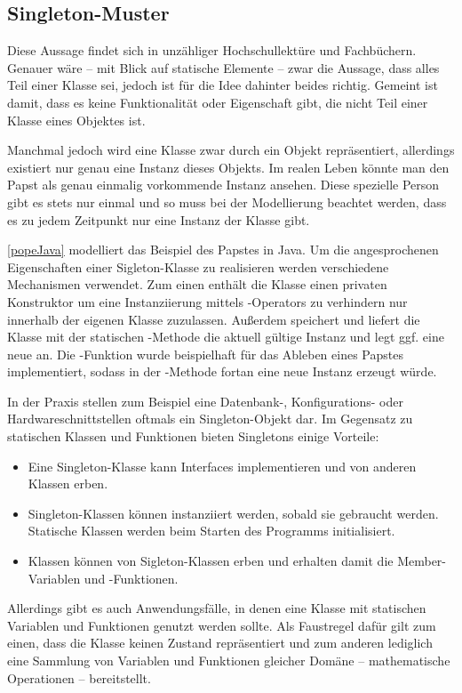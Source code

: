\subsection{Singleton-Muster}
 \cite{susanne_hackmack_objekte_2018} Diese Aussage findet sich in unzähliger Hochschullektüre und Fachbüchern. Genauer wäre -- mit Blick auf statische Elemente -- zwar die Aussage, dass alles Teil einer Klasse sei, jedoch ist für die Idee dahinter beides richtig. Gemeint ist damit, dass es keine Funktionalität oder Eigenschaft gibt, die nicht Teil einer Klasse \bzw eines Objektes ist.

Manchmal jedoch wird eine Klasse zwar durch ein Objekt repräsentiert, allerdings existiert nur genau eine Instanz dieses Objekts. Im realen Leben könnte man \zB den Papst als genau einmalig vorkommende Instanz ansehen. Diese spezielle Person gibt es stets nur einmal und so muss bei der Modellierung beachtet werden, dass es zu jedem Zeitpunkt nur eine Instanz der Klasse gibt.


\autoref{popeJava} modelliert das Beispiel des Papstes in Java. Um die angesprochenen Eigenschaften einer Sigleton-Klasse zu realisieren werden verschiedene Mechanismen verwendet. Zum einen enthält die Klasse einen privaten Konstruktor um eine Instanziierung mittels -Operators zu verhindern \bzw nur innerhalb der eigenen Klasse zuzulassen. Außerdem speichert und liefert die Klasse mit der statischen -Methode die aktuell gültige Instanz und legt ggf. eine neue an. Die -Funktion wurde beispielhaft für das Ableben eines Papstes implementiert, sodass in der -Methode fortan eine neue Instanz erzeugt würde.

In der Praxis stellen zum Beispiel eine Datenbank-, Konfigurations- oder Hardwareschnittstellen oftmals ein Singleton-Objekt dar. Im Gegensatz zu statischen Klassen und Funktionen bieten Singletons einige Vorteile:

\begin{itemize}
    \item Eine Singleton-Klasse kann Interfaces implementieren und von anderen Klassen erben.
    \item Singleton-Klassen können instanziiert werden, sobald sie gebraucht werden. Statische Klassen werden beim Starten des Programms initialisiert.
    \item Klassen können von Sigleton-Klassen erben und erhalten damit die Member-Variablen und -Funktionen.
\end{itemize}

Allerdings gibt es auch Anwendungsfälle, in denen eine Klasse mit statischen Variablen und Funktionen genutzt werden sollte. Als Faustregel dafür gilt zum einen, dass die Klasse keinen Zustand repräsentiert und zum anderen lediglich eine Sammlung von Variablen und Funktionen gleicher Domäne -- \zB mathematische Operationen -- bereitstellt.